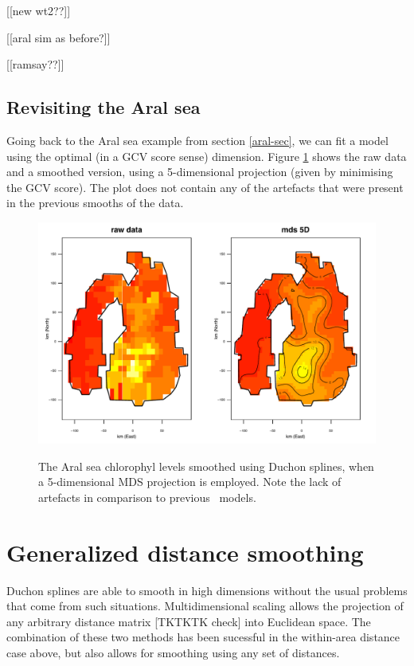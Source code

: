 [[new wt2??]]

[[aral sim as before?]]

[[ramsay??]]



\subsection{Revisiting the Aral sea}

Going back to the Aral sea example from section \ref{aral-sec}, we can fit a model using the optimal (in a GCV score sense) dimension. Figure \ref{mds-aral-5d-duchon} shows the raw data and a smoothed version, using a 5-dimensional projection (given by minimising the GCV score). The plot does not contain any of the artefacts that were present in the previous smooths of the data.

\begin{figure}
\centering
\includegraphics[width=6in]{mds/figs/aral-5d-duchon.pdf} \\
\caption{The Aral sea chlorophyl levels smoothed using Duchon splines, when a 5-dimensional MDS projection is employed. Note the lack of artefacts in comparison to previous \mdsap\ models.}
\label{mds-aral-5d-duchon}
\end{figure}



\section{Generalized distance smoothing}
\label{gds-gds-examples}

Duchon splines are able to smooth in high dimensions without the usual problems that come from such situations. Multidimensional scaling allows the projection of any arbitrary distance matrix [TKTKTK check] into Euclidean space. The combination of these two methods has been sucessful in the within-area distance case above, but also allows for smoothing using any set of distances.

